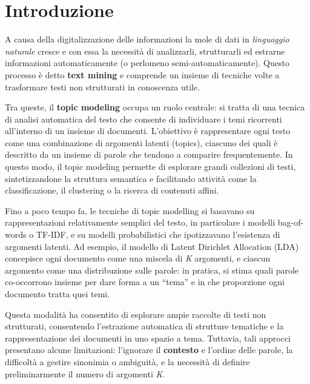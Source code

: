 \chapter{Introduzione}

A causa della digitalizzazione delle informazioni la mole di dati in \textit{linguaggio naturale} cresce e con essa la necessità di analizzarli, strutturarli ed estrarne informazioni automaticamente (o perlomeno semi-automaticamente).
Questo processo è detto \textbf{text mining} e comprende un insieme di tecniche volte a trasformare testi non strutturati in conoscenza utile.

Tra queste, il \textbf{topic modeling} occupa un ruolo centrale: si tratta di una tecnica di analisi automatica del testo che consente di individuare i temi ricorrenti all’interno di un insieme di documenti.
L’obiettivo è rappresentare ogni testo come una combinazione di argomenti latenti (topics), ciascuno dei quali è descritto da un insieme di parole che tendono a comparire frequentemente.
In questo modo, il topic modeling permette di esplorare grandi collezioni di testi, sintetizzandone la struttura semantica e facilitando attività come la classificazione, il clustering o la ricerca di contenuti affini.

Fino a poco tempo fa, le tecniche di topic modelling si basavano su rappresentazioni relativamente semplici del testo, in particolare i modelli bag-of-words o TF-IDF, e su modelli probabilistici che ipotizzavano l’esistenza di argomenti latenti. Ad esempio, il modello di Latent Dirichlet Allocation (LDA) concepisce ogni documento come una miscela di \textit{K} argomenti, e ciascun argomento come una distribuzione sulle parole: in pratica, si stima quali parole co-occorrono insieme per dare forma a un “tema” e in che proporzione ogni documento tratta quei temi.

Questa modalità ha consentito di esplorare ampie raccolte di testi non strutturati, consentendo l’estrazione automatica di strutture tematiche e la rappresentazione dei documenti in uno spazio a tema. Tuttavia, tali approcci presentano alcune limitazioni: l’ignorare il \textbf{contesto} e l’ordine delle parole, la difficoltà a gestire sinonimia o ambiguità, e la necessità di definire preliminarmente il numero di argomenti \textit{K}.

